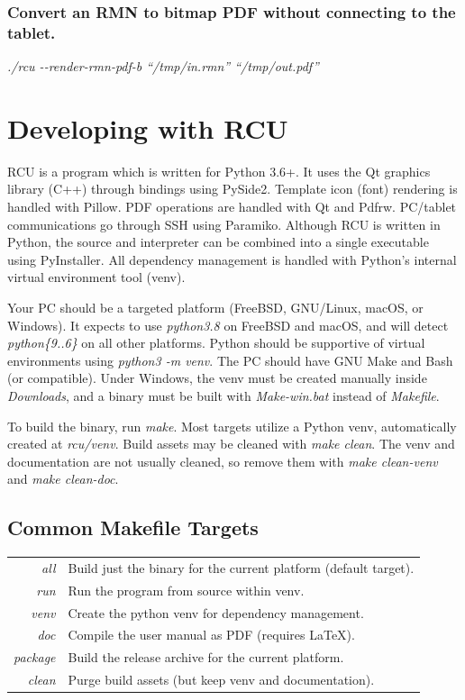 \documentclass{memoir}
\begin{document}
{\subsection{Convert an RMN to bitmap PDF without connecting to the tablet.}
\textit{./rcu \--\--render-rmn-pdf-b ``/tmp/in.rmn'' ``/tmp/out.pdf''}









\newpage
\chapter{Developing with RCU}
\label{sec:developing}
RCU is a program which is written for Python 3.6+. It uses the Qt graphics library (C++) through bindings using PySide2. Template icon (font) rendering is handled with Pillow. PDF operations are handled with Qt and Pdfrw. PC/tablet communications go through SSH using Paramiko. Although RCU is written in Python, the source and interpreter can be combined into a single executable using PyInstaller. All dependency management is handled with Python's internal virtual environment tool (venv).

Your PC should be a targeted platform (FreeBSD, GNU/Linux, macOS, or Windows). It expects to use \textit{python3.8} on FreeBSD and macOS, and will detect \textit{python\{9..6\}} on all other platforms. Python should be supportive of virtual environments using \textit{python3 -m venv}. The PC should have GNU Make and Bash (or compatible). Under Windows, the venv must be created manually inside \textit{Downloads}, and a binary must be built with \textit{Make-win.bat} instead of \textit{Makefile}.

To build the binary, run \textit{make}. Most targets utilize a Python venv, automatically created at \textit{rcu/venv}. Build assets may be cleaned with \textit{make clean}. The venv and documentation are not usually cleaned, so remove them with \textit{make clean-venv} and \textit{make clean-doc}.

\section{Common Makefile Targets}
\label{sec:makefile}

\begin{tabular}{ r | l }
  \textit{all} & Build just the binary for the current platform (default target). \\
  \textit{run} & Run the program from source within venv. \\
  \textit{venv} & Create the python venv for dependency management. \\
  \textit{doc} & Compile the user manual as PDF (requires \LaTeX). \\
  \textit{package} & Build the release archive for the current platform. \\
  \textit{clean} & Purge build assets (but keep venv and documentation). \\
\end{tabular}




}
\end{document}
